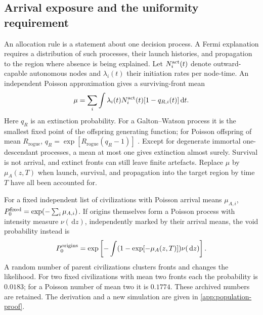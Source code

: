 \documentclass[11pt,a4paper]{article}
\theoremstyle{definition}\newtheorem{definition}{Definition}
\newcommand{\dd}{\,\mathrm{d}}
\newcommand{\Rogue}{R_{\mathrm{rogue}}}
\begin{document}
\subsection{Arrival exposure and the uniformity requirement}
An allocation rule is a statement about one decision process. A Fermi
explanation requires a distribution of such processes, their launch
histories, and propagation to the region where absence is being explained.
Let $N_i^{\rm act}(t)$ denote outward-capable autonomous nodes and
$\lambda_i(t)$ their initiation rates per node-time. An independent
Poisson approximation gives a surviving-front mean
\begin{equation}
 \mu=\sum_i\int\lambda_i(t)N_i^{\rm act}(t)[1-q_{R,i}(t)]\dd t.
 \label{eq:mu}
\end{equation}
Here $q_R$ is an extinction probability. For a Galton--Watson process it
is the smallest fixed point of the offspring generating function; for
Poisson offspring of mean $\Rogue$,
$q_R=\exp[\Rogue(q_R-1)]$ \citep{Harris1963}. Except for degenerate
immortal one-descendant processes, a mean at most one gives extinction
almost surely. Survival is not arrival, and extinct fronts can still
leave finite artefacts. Replace $\mu$ by $\mu_A(z,T)$ when launch,
survival, and propagation into the target region by time $T$ have all
been accounted for.

For a fixed independent list of civilizations with Poisson arrival
means $\mu_{A,i}$, $P_0^{\rm fixed}=\exp(-\sum_i\mu_{A,i})$.
If origins themselves form a Poisson process with intensity measure
$\nu(\dd z)$, independently marked by their arrival means, the void
probability instead is
\begin{equation}
 P_0^{\rm origins}
 =\exp\left[-\int(1-\exp[-\mu_A(z,T)])\nu(\dd z)\right].
 \label{eq:origins}
\end{equation}
A random number of parent civilizations clusters fronts and changes the
likelihood. For two fixed civilizations with mean two fronts each the
probability is $0.0183$; for a Poisson number of mean two it is $0.1774$.
These archived numbers are retained. The derivation and a new simulation
are given in \cref{app:population-proof}.
\end{document}
